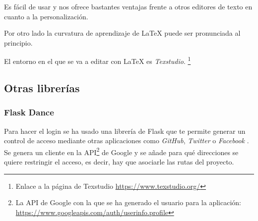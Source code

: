 Es fácil de usar y nos ofrece bastantes ventajas frente a otros editores de texto en cuanto a la personalización. 

Por otro lado la curvatura de aprendizaje de \LaTeX{} puede ser pronunciada al principio.

El entorno en el que se va a editar con \LaTeX{} es \textit{Texstudio}. \footnote{Enlace a la página de Texstudio \url{https://www.texstudio.org/}}

\subsection{Otras librerías}

\subsubsection{Flask Dance}
Para hacer el login se ha usado una librería de Flask que te permite generar un control de acceso mediante otras aplicaciones como \textit{GitHub}, \textit{Twitter} o \textit{Facebook} \cite{dance}.
Se genera un cliente en la API\footnote{La API de Google con la que se ha generado el usuario para la aplicación: \url{https://www.googleapis.com/auth/userinfo.profile}} de Google y se añade para qué direcciones se quiere restringir el acceso, es decir, hay que asociarle las rutas del proyecto.




